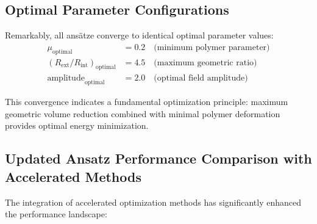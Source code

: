 \documentclass[11pt,a4paper]{article}
\begin{document}
\begin{table}[h]
\subsection{Optimal Parameter Configurations}

Remarkably, all ansätze converge to identical optimal parameter values:
\begin{align}
\mu_{\text{optimal}} &= 0.2 \quad \text{(minimum polymer parameter)} \\
(R_{\text{ext}}/R_{\text{int}})_{\text{optimal}} &= 4.5 \quad \text{(maximum geometric ratio)} \\
\text{amplitude}_{\text{optimal}} &= 2.0 \quad \text{(optimal field amplitude)}
\end{align}

This convergence indicates a fundamental optimization principle: maximum geometric volume reduction combined with minimal polymer deformation provides optimal energy minimization.

\subsection{Updated Ansatz Performance Comparison with Accelerated Methods}

The integration of accelerated optimization methods has significantly enhanced the performance landscape:


\end{table}
\end{document}
